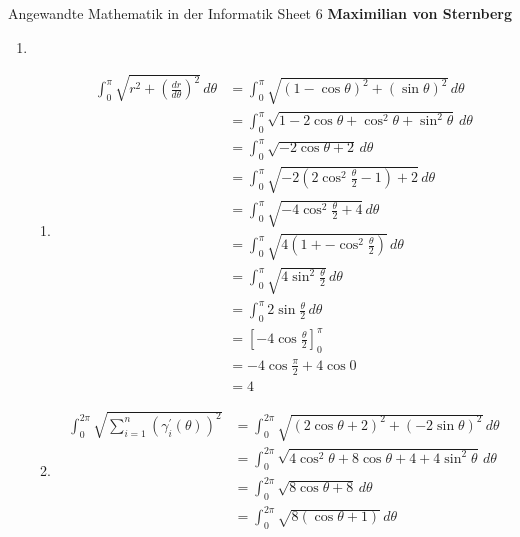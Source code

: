 \documentclass[]{book}
\theoremstyle{definition}
\begin{document}
\begin{center}
{\Large  Angewandte Mathematik in der Informatik \hspace{0.5cm} Sheet 6}
\textbf{Maximilian von Sternberg} %
\end{center}

\vspace{0.2 cm}

\begin{enumerate}
    \item \begin{enumerate}
        \item \begin{align*}
            \int_0^\pi \sqrt{r^2 + (\frac{dr}{d\theta})^2} \, d\theta &= \int_0^\pi \sqrt{(1 - \cos \theta)^2 + (\sin \theta)^2} \, d\theta \\
            & = \int_0^\pi \sqrt{1 - 2\cos\theta + \cos^2\theta + \sin^2 \theta} \, d\theta \\
            & = \int_0^\pi \sqrt{- 2\cos\theta + 2} \, d\theta \\
            & = \int_0^\pi \sqrt{- 2(2\cos^2 \frac{\theta}{2} - 1) + 2} \, d\theta \\
            & = \int_0^\pi \sqrt{- 4\cos^2 \frac{\theta}{2} + 4} \, d\theta \\
            & = \int_0^\pi \sqrt{4(1 + - \cos^2 \frac{\theta}{2})} \, d\theta \\
            & = \int_0^\pi \sqrt{4\sin^2 \frac{\theta}{2}} \, d\theta \\
            & = \int_0^\pi 2\sin \frac{\theta}{2} \, d\theta \\
            & = [-4\cos \frac{\theta}{2}]_0^\pi \\
            & = -4 \cos \frac{\pi}{2} + 4\cos 0 \\
            & = 4        
        \end{align*}
            \item \begin{align*}
                \int_0^{2\pi} \sqrt{ \sum_{i=1}^{n} (\gamma^\prime_i(\theta))^2 } & = \int_0^{2\pi} \sqrt{(2\cos \theta + 2)^2 + (-2\sin\theta)^2} \, d\theta \\
                & = \int_0^{2\pi} \sqrt{4\cos^2 \theta + 8\cos \theta + 4 + 4 \sin^2\theta} \, d\theta \\
                & = \int_0^{2\pi} \sqrt{8\cos \theta + 8} \, d\theta \\
                & = \int_0^{2\pi} \sqrt{8(\cos \theta + 1)} \, d\theta \\

\end{align*}
\end{enumerate}
\end{enumerate}
\end{document}
